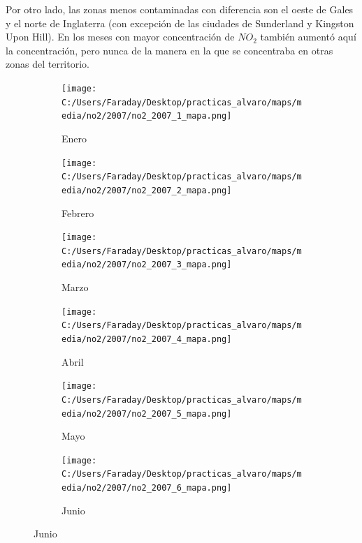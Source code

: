 \documentclass[12pt]{article}
\begin{document}
Por otro lado, las zonas menos contaminadas con diferencia son el oeste de Gales y el norte de Inglaterra (con excepción de las ciudades de Sunderland y Kingston Upon Hill). En los meses con mayor concentración de $NO_{2}$ también aumentó aquí la concentración, pero nunca de la manera en la que se concentraba en otras zonas del territorio.

\begin{figure}[H]
\centering
\begin{subfigure}[H]{0.15\textwidth}
\texttt{[image: C:/Users/Faraday/Desktop/practicas\_alvaro/maps/media/no2/2007/no2\_2007\_1\_mapa.png]}
\captionsetup{labelformat=empty}
\caption{Enero}
\label{fig:map-no2-2007-1}
\end{subfigure}
%
\begin{subfigure}[H]{0.15\textwidth}
\texttt{[image: C:/Users/Faraday/Desktop/practicas\_alvaro/maps/media/no2/2007/no2\_2007\_2\_mapa.png]}
\captionsetup{labelformat=empty}
\caption{Febrero}
\label{fig:map-no2-2007-2}
\end{subfigure}
%
\begin{subfigure}[H]{0.15\textwidth}
\texttt{[image: C:/Users/Faraday/Desktop/practicas\_alvaro/maps/media/no2/2007/no2\_2007\_3\_mapa.png]}
\captionsetup{labelformat=empty}
\caption{Marzo}
\label{fig:map-no2-2007-3}
\end{subfigure}
%
\begin{subfigure}[H]{0.15\textwidth}
\texttt{[image: C:/Users/Faraday/Desktop/practicas\_alvaro/maps/media/no2/2007/no2\_2007\_4\_mapa.png]}
\captionsetup{labelformat=empty}
\caption{Abril}
\label{fig:map-no2-2007-4}
\end{subfigure}
%
\begin{subfigure}[H]{0.15\textwidth}
\texttt{[image: C:/Users/Faraday/Desktop/practicas\_alvaro/maps/media/no2/2007/no2\_2007\_5\_mapa.png]}
\captionsetup{labelformat=empty}
\caption{Mayo}
\label{fig:map-no2-2007-5}
\end{subfigure}
%
\begin{subfigure}[H]{0.15\textwidth}
\texttt{[image: C:/Users/Faraday/Desktop/practicas\_alvaro/maps/media/no2/2007/no2\_2007\_6\_mapa.png]}
\captionsetup{labelformat=empty}
\caption{Junio}
\label{fig:map-no2-2007-6}
\end{subfigure}


\end{figure}
\end{document}
